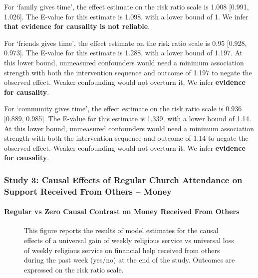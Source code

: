 \documentclass[
  single column]{article}
\let\oldparagraph\paragraph
\renewcommand{\paragraph}[1]{\oldparagraph{#1}\mbox{}}
\begin{document}
For `family gives time', the effect estimate on the risk ratio scale is
1.008 {[}0.991, 1.026{]}. The E-value for this estimate is 1.098, with a
lower bound of 1. We infer \textbf{that evidence for causality is not
reliable}.

For `friends gives time', the effect estimate on the risk ratio scale is
0.95 {[}0.928, 0.973{]}. The E-value for this estimate is 1.288, with a
lower bound of 1.197. At this lower bound, unmeasured confounders would
need a minimum association strength with both the intervention sequence
and outcome of 1.197 to negate the observed effect. Weaker confounding
would not overturn it. We infer \textbf{evidence for causality}.

For `community gives time', the effect estimate on the risk ratio scale
is 0.936 {[}0.889, 0.985{]}. The E-value for this estimate is 1.339,
with a lower bound of 1.14. At this lower bound, unmeasured confounders
would need a minimum association strength with both the intervention
sequence and outcome of 1.14 to negate the observed effect. Weaker
confounding would not overturn it. We infer \textbf{evidence for
causality}.

\newpage{}

\subsubsection{Study 3: Causal Effects of Regular Church Attendance on
Support Received From Others --
Money}\label{study-3-causal-effects-of-regular-church-attendance-on-support-received-from-others-money}

\paragraph{Regular vs Zero Causal Contrast on Money Received From
Others}\label{regular-vs-zero-causal-contrast-on-money-received-from-others}

\begin{figure}


\caption{\label{fig-3_1}This figure reports the results of model
estimates for the causal effects of a universal gain of weekly religious
service vs universal loss of weekly religious service on financial help
received from others during the past week (yes/no) at the end of the
study. Outcomes are expressed on the risk ratio scale.}

\end{figure}%
\end{document}
